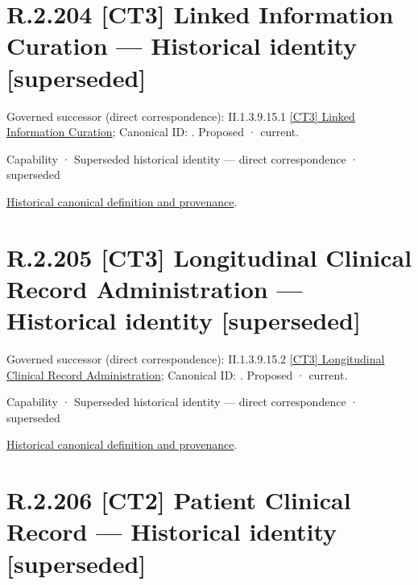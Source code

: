 \section*{R.2.204 [CT3] Linked Information Curation — Historical identity [superseded]}
\label{navigation:R.2.204}

{\small Governed successor (direct correspondence): II.1.3.9.15.1 \hyperref[element:5edb2a8b5ee54ddda8104d1fab323a94]{[CT3] Linked Information Curation}; Canonical ID: \texttt{}. Proposed · current.}\par
\label{element:9d0925bb39664a5985cacf3cea7442d1}
{\small Capability · Superseded historical identity — direct correspondence · superseded}\par
\href{../../../../../../../continuum/strategy/capability/9d0925bb39664a5985cacf3cea7442d1.md}{Historical canonical definition and provenance}.\par
\section*{R.2.205 [CT3] Longitudinal Clinical Record Administration — Historical identity [superseded]}
\label{navigation:R.2.205}

{\small Governed successor (direct correspondence): II.1.3.9.15.2 \hyperref[element:14748dc6117f4b6ba7c0fc554b76bd89]{[CT3] Longitudinal Clinical Record Administration}; Canonical ID: \texttt{}. Proposed · current.}\par
\label{element:bd91d848cf424c42bec7c80cd32edd28}
{\small Capability · Superseded historical identity — direct correspondence · superseded}\par
\href{../../../../../../../continuum/strategy/capability/bd91d848cf424c42bec7c80cd32edd28.md}{Historical canonical definition and provenance}.\par
\section*{R.2.206 [CT2] Patient Clinical Record — Historical identity [superseded]}
\label{navigation:R.2.206}

